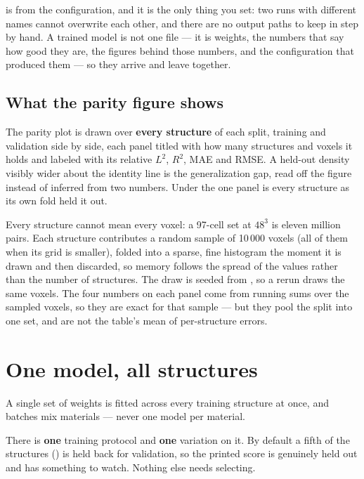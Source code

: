 \noindent
{} is  from the configuration, and it is the only
thing you set: two runs with different names cannot overwrite each other, and
there are no output paths to keep in step by hand. A trained model is not one
file --- it is weights, the numbers that say how good they are, the figures
behind those numbers, and the configuration that produced them --- so they
arrive and leave together.

\subsection{What the parity figure shows}

The parity plot is drawn over \textbf{every structure} of each split, training
and validation side by side, each panel titled with how many structures and
voxels it holds and labeled with its relative $L^2$, $R^2$, MAE and RMSE. A
held-out density visibly wider about the identity line is the generalization
gap, read off the figure instead of inferred from two numbers. Under
 the one panel is every structure as its own fold held it out.

Every structure cannot mean every voxel: a 97-cell set at $48^3$ is eleven
million pairs. Each structure contributes a random sample of 10\,000 voxels
(all of them when its grid is smaller), folded into a sparse, fine histogram the
moment it is drawn and then discarded, so memory follows the spread of the
values rather than the number of structures. The draw is seeded from
, so a rerun draws the same voxels. The four numbers on each
panel come from running sums over the sampled voxels, so they are exact for
that sample --- but they pool the split into one set, and are not the table's
mean of per-structure errors.

\section{One model, all structures}

A single set of weights is fitted across every training structure at once, and
batches mix materials --- never one model per material.

\begin{pnote}
There is \textbf{one} training protocol and \textbf{one} variation on it. By
default a fifth of the structures () is held back for
validation, so the printed score is genuinely held out and
 has something to watch. Nothing else needs selecting.
\end{pnote}


